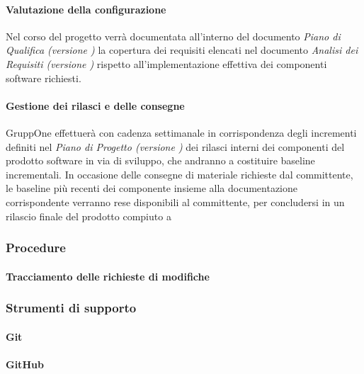 \documentclass[../../norme-di-progetto.tex]{subfiles}
\begin{document}
\paragraph{Valutazione della configurazione}%
\label{par:valutazione_della_configurazione}

Nel corso del progetto verrà documentata all'interno del documento \textit{Piano di Qualifica
  (versione \versione)} la copertura dei requisiti elencati nel documento \textit{Analisi dei Requisiti (versione \versione)} rispetto all'implementazione effettiva dei componenti software richiesti.


\paragraph{Gestione dei rilasci e delle consegne}%
\label{par:gestione_dei_rilasci_e_delle_consegne}

GruppOne effettuerà con cadenza settimanale in corrispondenza degli incrementi definiti nel \textit{Piano di Progetto (versione \versione)} dei rilasci interni dei componenti del prodotto software in via di sviluppo, che andranno a costituire baseline incrementali. In occasione delle consegne di materiale richieste dal committente, le baseline più recenti dei componente insieme alla documentazione corrispondente verranno rese disponibili al committente, per concludersi in un rilascio finale del prodotto compiuto a



\subsubsection{Procedure}%
\label{subs:gestione_della_configurazione/procedure}

\paragraph{Tracciamento delle richieste di modifiche}%
\label{par:tracciamento_delle_richieste_di_modifiche}



\subsubsection{Strumenti di supporto}%
\label{subs:gestione_della_configurazione/strumenti_di_supporto}

\paragraph{Git}%
\label{par:git}


\paragraph{GitHub}%
\label{par:github}

\end{document}
